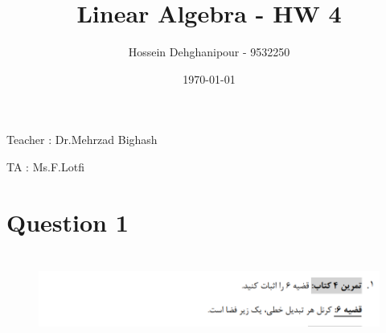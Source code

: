 \documentclass[a4paper,12pt]{article}
\begin{document}
    \begin{titlepage}
        \begin{center}
            \title{\Large{\textbf{Linear Algebra - HW 4}}}
            \author{Hossein Dehghanipour - 9532250}
            \date{\today}
        \end{center}
    \end{titlepage}

    \maketitle
\begin{doublespace}
\begin{flushleft}
\begin{doublespace}
	Teacher :  Dr.Mehrzad Bighash
\end{doublespace} 
\begin{doublespace}
	TA : Ms.F.Lotfi
\end{doublespace} 
\end{flushleft}
\end{doublespace} 

\newpage
\setmainfont{Times New Roman}
\tableofcontents
\thispagestyle{empty}
\newpage
{}


\fontsize{15pt}{15pt}
\newcommand{\nnl}{\newline \noindent}
\newcommand{\ptx}{ P_{tx} }
\newcommand{\prx}{ P_{rx} }
\section {Question 1}

\begin{figure}[h!]
	\centering
	\includegraphics*[height=3cm]{Q1}
\end{figure}
\end{document}
